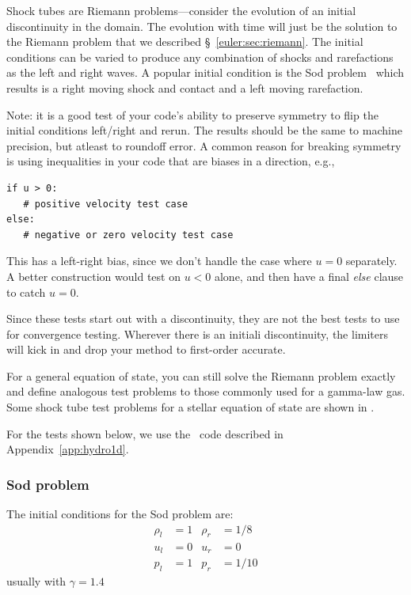 Shock tubes are Riemann problems---consider the evolution of an
initial discontinuity in the domain.  The evolution with time will
just be the solution to the Riemann problem that we described
\S~\ref{euler:sec:riemann}.  The initial conditions can be varied to
produce any combination of shocks and rarefactions as the left and
right waves.  A popular initial condition is the Sod
problem~\cite{sod:1978} which results is a right moving shock and
contact and a left moving rarefaction.

Note: it is a good test of your code's ability to preserve symmetry to
flip the initial conditions left/right and rerun.  The results should
be the same to machine precision, but atleast to roundoff error.  A
common reason for breaking symmetry is using inequalities in your code
that are biases in a direction, e.g.,
\begin{lstlisting}
if u > 0:
   # positive velocity test case
else:
   # negative or zero velocity test case
\end{lstlisting}
This has a left-right bias, since we don't handle the case where $u =
0$ separately.  A better construction would test on $u < 0$ alone, and
then have a final {\em else} clause to catch $u = 0$.

Since these tests start out with a discontinuity, they are not the
best tests to use for convergence testing.  Wherever there is an
initiali discontinuity, the limiters will kick in and drop your
method to first-order accurate.

For a general equation of state, you can still solve the Riemann
problem exactly and define analogous test problems to those commonly
used for a gamma-law gas.  Some shock tube test problems for a stellar
equation of state are shown in \cite{zingalekatz}.

For the tests shown below, we use the \hydrooned\ code described in
Appendix~\ref{app:hydro1d}.

\subsubsection{Sod problem}

The initial conditions for the Sod problem \cite{sod:1978} are:
\begin{align}
\rho_l &= 1      &  \rho_r &= 1/8 \nonumber \\
u_l   &= 0       &  u_r    &= 0   \\
p_l    &= 1      &  p_r    &= 1/10 \nonumber
\end{align}
usually with $\gamma = 1.4$


